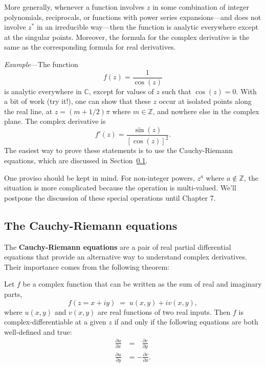 \documentclass[10pt,a4paper]{article}
\begin{document}
More generally, whenever a function involves $z$ in some combination
of integer polynomials, reciprocals, or functions with power series
expansions---and does not involve $z^*$ in an irreducible way---then
the function is analytic everywhere except at the singular
points. Moreover, the formula for the complex derivative is the same
as the corresponding formula for real derivatives.

\begin{framed}\noindent
  \textit{Example}---The function
  \begin{equation}
    f(z) = \frac{1}{\cos(z)}
  \end{equation}
  is analytic everywhere in $\mathbb{C}$, except for values of $z$
  such that $\cos(z) = 0$.  With a bit of work (try it!), one can show
  that these $z$ occur at isolated points along the real line, at $z =
  (m+1/2)\pi$ where $m \in \mathbb{Z}$, and nowhere else in the
  complex plane. The complex derivative is
  \begin{equation}
    f'(z) = \frac{\sin(z)}{[\cos(z)]^2}.
  \end{equation}
  The easiest way to prove these statements is to use the
  Cauchy-Riemann equations, which are discussed in
  Section~\ref{the-cauchy-riemann-equations}.
\end{framed}

One proviso should be kept in mind. For non-integer powers, $z^a$
where $a\notin \mathbb{Z}$, the situation is more complicated because
the operation is multi-valued. We'll postpone the discussion of these
special operations until Chapter 7.

\subsection{The Cauchy-Riemann equations}
\label{the-cauchy-riemann-equations}

The \textbf{Cauchy-Riemann equations} are a pair of real partial
differential equations that provide an alternative way to understand
complex derivatives. Their importance comes from the following
theorem:
\begin{framed}
\noindent
Let $f$ be a complex function that can be written as the sum of real
and imaginary parts, 
\begin{equation}
  f(z = x + iy) \;=\; u(x,y) + i v(x,y),
\end{equation} where
$u(x,y)$ and $v(x,y)$ are real functions of two real inputs. Then
$f$ is complex-differentiable at a given $z$ if and only if the
following equations are both well-defined and true:
\begin{align}
  \frac{\partial u}{\partial x} &= \;\;\, \frac{\partial v}{\partial y}
  \label{cr1} \\
  \frac{\partial u}{\partial y} &= -\frac{\partial v}{\partial x}.
  \label{cr2}
\end{align}
\end{framed}
\end{document}
